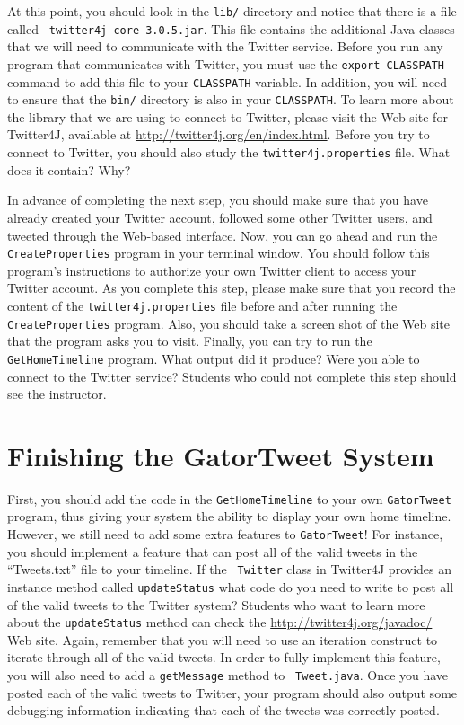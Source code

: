 \begin{sloppypar} At this point, you should look in the {\tt lib/} directory and notice that there is a file called {\tt
    twitter4j-core-3.0.5.jar}.  This file contains the additional Java classes that we will need to communicate with the Twitter
  service. Before you run any program that communicates with Twitter, you must use the {\tt export CLASSPATH} command to add this
  file to your {\tt CLASSPATH} variable.  In addition, you will need to ensure that the {\tt bin/} directory is also in
  your {\tt CLASSPATH}. To learn more about the library that we are using to connect to Twitter, please visit
  the Web site for Twitter4J, available at \url{http://twitter4j.org/en/index.html}. Before you try to connect to Twitter,
  you should also study the {\tt twitter4j.properties} file. What does it contain? Why?  \end{sloppypar}

In advance of completing the next step, you should make sure that you have already created your Twitter account, followed some
other Twitter users, and tweeted through the Web-based interface. Now, you can go ahead and run the {\tt CreateProperties}
program in your terminal window.  You should follow this program's instructions to authorize your own Twitter client to access
your Twitter account.  As you complete this step, please make sure that you record the content of the {\tt twitter4j.properties}
file before and after running the {\tt CreateProperties} program.  Also, you should take a screen shot of the Web site that the
program asks you to visit. Finally, you can try to run the {\tt GetHomeTimeline} program.  What output did it produce? Were you
able to connect to the Twitter service? Students who could not complete this step should see the instructor.

\section*{Finishing the GatorTweet System}
  
First, you should add the code in the {\tt GetHomeTimeline} to your own {\tt GatorTweet} program, thus giving your system the
ability to display your own home timeline.  However, we still need to add some extra features to {\tt GatorTweet}!  For instance,
you should implement a feature that can post all of the valid tweets in the ``Tweets.txt'' file to your timeline.  If the {\tt
  Twitter} class in Twitter4J provides an instance method called {\tt updateStatus} what code do you need to write to post all of
the valid tweets to the Twitter system?  Students who want to learn more about the {\tt updateStatus} method can check the
\url{http://twitter4j.org/javadoc/} Web site.  Again, remember that you will need to use an iteration construct to iterate through
all of the valid tweets.  In order to fully implement this feature, you will also need to add a {\tt getMessage} method to {\tt
  Tweet.java}. Once you have posted each of the valid tweets to Twitter, your program should also output some debugging
information indicating that each of the tweets was correctly posted.  

